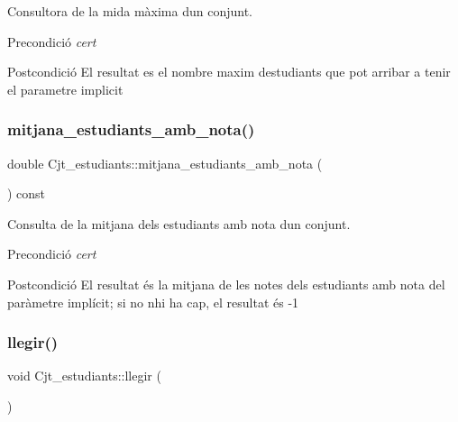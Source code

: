 Consultora de la mida màxima d\textquotesingle{}un conjunt. 

\begin{DoxyPrecond}{Precondició}
{\itshape cert} 
\end{DoxyPrecond}
\begin{DoxyPostcond}{Postcondició}
El resultat es el nombre maxim d\textquotesingle{}estudiants que pot arribar a tenir el parametre implicit 
\end{DoxyPostcond}
\mbox{\label{class_cjt__estudiants_a8c8099d5080864a677743e5e1d1bbdf8}} 
\subsubsection{\texorpdfstring{mitjana\+\_\+estudiants\+\_\+amb\+\_\+nota()}{mitjana\_estudiants\_amb\_nota()}}
{\footnotesize\ttfamily double Cjt\+\_\+estudiants\+::mitjana\+\_\+estudiants\+\_\+amb\+\_\+nota (\begin{DoxyParamCaption}{ }\end{DoxyParamCaption}) const}



Consulta de la mitjana dels estudiants amb nota d\textquotesingle{}un conjunt. 

\begin{DoxyPrecond}{Precondició}
{\itshape cert} 
\end{DoxyPrecond}
\begin{DoxyPostcond}{Postcondició}
El resultat és la mitjana de les notes dels estudiants amb nota del paràmetre implícit; si no n\textquotesingle{}hi ha cap, el resultat és -\/1 
\end{DoxyPostcond}
\mbox{\label{class_cjt__estudiants_aa24c2d4c36167b2b810ab459435b67a8}} 
\subsubsection{\texorpdfstring{llegir()}{llegir()}}
{\footnotesize\ttfamily void Cjt\+\_\+estudiants\+::llegir (\begin{DoxyParamCaption}{ }\end{DoxyParamCaption})}



